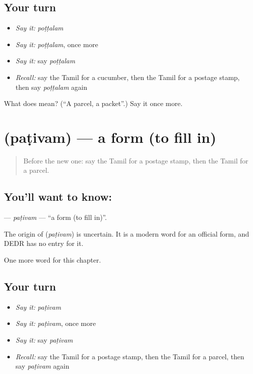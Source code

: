 \subsection*{Your turn}
\begin{itemize}
\raggedright
  \item \emph{Say it:} \emph{poṭṭalam}
  \item \emph{Say it:} \emph{poṭṭalam}, once more
  \item \emph{Say it:} say \emph{poṭṭalam}
  \item \emph{Recall:} say the Tamil for a cucumber, then the Tamil for a postage stamp, then say \emph{poṭṭalam} again
\end{itemize}

\begin{tcolorbox}[breakable,colback=teal!4,colframe=teal!35!black,title={Before you move on}]
What does  mean? (\textquotedblleft{}A parcel, a packet\textquotedblright{}.) Say it once more.
\end{tcolorbox}
\section[\texorpdfstring{\ta{படிவம்} (paṭivam)}{படிவம் (paṭivam)}]{ (paṭivam) — a form (to fill in)}

\label{lesson:TA-C244-pativam}



\begin{quote}
Before the new one: say the Tamil for a postage stamp, then the Tamil for a parcel.
\end{quote}

\subsection*{You'll want to know: }
\textbf{} — \emph{paṭivam} — \textquotedblleft{}a form (to fill in)\textquotedblright{}.

\begin{cousinweb}
The origin of \textbf{} (\emph{paṭivam}) is uncertain. It is a modern word for an official form, and DEDR has no entry for it.
\end{cousinweb}

\begin{grammarlens}[title={What you've built}]
One more word for this chapter.
\end{grammarlens}

\subsection*{Your turn}
\begin{itemize}
\raggedright
  \item \emph{Say it:} \emph{paṭivam}
  \item \emph{Say it:} \emph{paṭivam}, once more
  \item \emph{Say it:} say \emph{paṭivam}
  \item \emph{Recall:} say the Tamil for a postage stamp, then the Tamil for a parcel, then say \emph{paṭivam} again
\end{itemize}

